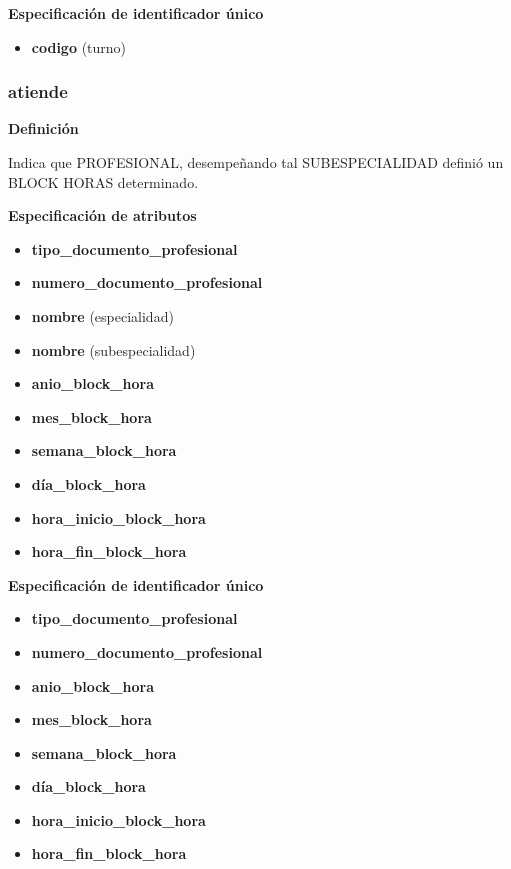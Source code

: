 \documentclass[a4paper,11pt]{article}
\begin{document}
\textbf{Especificación de identificador único}

\begin{itemize}

     \item \textbf{codigo} (turno)


\end{itemize}

\subsubsection{\textbf{atiende}}

\textbf{Definición}

Indica que PROFESIONAL, desempeñando tal SUBESPECIALIDAD definió un BLOCK 
HORAS determinado.

\textbf{Especificación de atributos}


\begin{itemize}
     		\item \textbf{tipo\_documento\_profesional}

     		\item \textbf{numero\_documento\_profesional} 

		\item \textbf{nombre} (especialidad)

		\item \textbf{nombre} (subespecialidad)

	\item \textbf{anio\_block\_hora} 
	\item \textbf{mes\_block\_hora}
	\item \textbf{semana\_block\_hora}
	\item \textbf{día\_block\_hora} 
	\item \textbf{hora\_inicio\_block\_hora}
	\item \textbf{hora\_fin\_block\_hora}


\end{itemize}

\textbf{Especificación de identificador único}

\begin{itemize}

     \item \textbf{tipo\_documento\_profesional}

     \item \textbf{numero\_documento\_profesional} 
		
	\item \textbf{anio\_block\_hora} 
	\item \textbf{mes\_block\_hora}
	\item \textbf{semana\_block\_hora}
	\item \textbf{día\_block\_hora} 
	\item \textbf{hora\_inicio\_block\_hora}
	\item \textbf{hora\_fin\_block\_hora}

\end{itemize}
\end{document}
